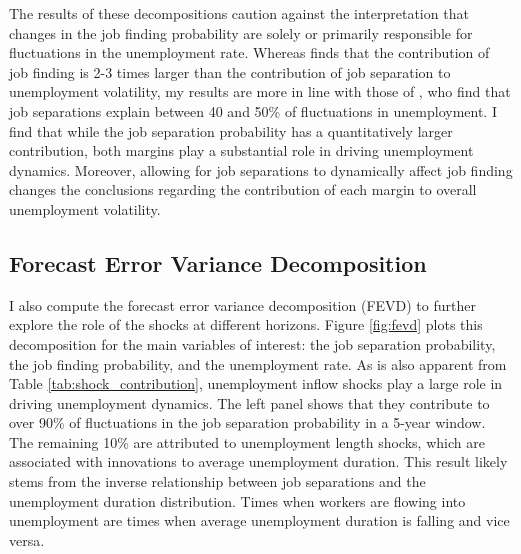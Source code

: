 \documentclass[12pt]{article}
\begin{document}
The results of these decompositions caution against the interpretation that changes in the job finding probability are solely or primarily responsible for fluctuations in the unemployment rate. Whereas \cite{Shimer:2012aa} finds that the contribution of job finding is 2-3 times larger than the contribution of job separation to unemployment volatility, my results are more in line with those of \cite{Fujita:2009aa}, who find that job separations explain between 40 and 50\% of fluctuations in unemployment. I find that while the job separation probability has a quantitatively larger contribution, both margins play a substantial role in driving unemployment dynamics. Moreover, allowing for job separations to dynamically affect job finding changes the conclusions regarding the contribution of each margin to overall unemployment volatility. 

\subsection{Forecast Error Variance Decomposition}

I also compute the forecast error variance decomposition (FEVD) to further explore the role of the shocks at different horizons. Figure \ref{fig:fevd} plots this decomposition for the main variables of interest: the job separation probability, the job finding probability, and the unemployment rate. As is also apparent from Table \ref{tab:shock_contribution}, unemployment inflow shocks play a large role in driving unemployment dynamics. The left panel shows that they contribute to over 90\% of fluctuations in the job separation probability in a 5-year window. The remaining 10\% are attributed to unemployment length shocks, which are associated with innovations to average unemployment duration. This result likely stems from the inverse relationship between job separations and the unemployment duration distribution. Times when workers are flowing into unemployment are times when average unemployment duration is falling and vice versa.
\end{document}
